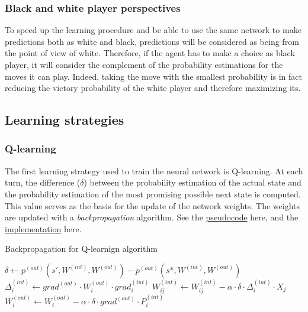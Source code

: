\documentclass{article}
\begin{document}
\subsubsection{Black and white player perspectives}

 To speed up the learning procedure and be able to use the same network to make predictions both as white and black, predictions will be considered as being from the point of view of white. Therefore, if the agent has to make a choice as black player, it will consider the complement of the probability estimations for the moves it can play. Indeed, taking the move with the smallest probability is in fact reducing the victory probability of the white player and therefore maximizing its.

\subsection{Learning strategies}

\subsubsection{Q-learning}

The first learning strategy used to train the neural network is Q-learning. At each turn, the difference ($\delta$) between the probability estimation of the actual state and the probability estimation of the most promising possible next state is computed. This value serves as the basis for the update of the network weights. The weights are updated with a \textit{backpropagation} algorithm. See the \hyperref[alg:backprop]{pseudocode} here, and the \hyperref[code:bp-code]{implementation} here.

\begin{algorithm}[H]
	\caption{Backpropagation for Q-learnign algorithm}
	\label{alg:backprop}
	\begin{algorithmic}[1]
	    \State $\delta \leftarrow p^{(out)}(s',W^{(int)},W^{(out)})-p^{(out)}(s*,W^{(int)},W^{(out)}) $
		    \State $\Delta_{i}^{(int)} \leftarrow grad^{(out)} \cdot W_{i}^{(out)} \cdot grad_{i}^{(int)}$
    		    \State $ W_{ij}^{(int)} \leftarrow W_{ij}^{(int)} - \alpha \cdot \delta \cdot \Delta_{i}^{(int)} \cdot X_{j} $
	    	\EndFor
	    	\State $ W_{i}^{(out)} \leftarrow W_{i}^{(out)} - \alpha \cdot \delta \cdot grad^{(out)} \cdot P_{i}^{(int)} $
	    \EndFor
	\end{algorithmic}
\end{algorithm}
\end{document}
